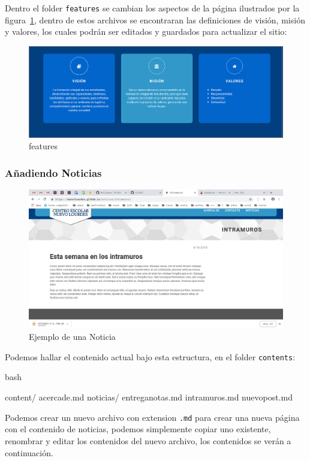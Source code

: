 Dentro el folder \texttt{features} se cambian los aspectos de la página ilustrados por la figura~\ref{fig:features}, dentro de estos archivos se encontraran las definiciones de visión, misión y valores, los cuales podrán ser editados y guardados para actualizar el sitio:

\begin{figure}[htbp]
\centering
\includegraphics[width=12cm]{../static/img/features.png}
\caption{features}
\label{fig:features}
\end{figure}

\subsubsection{Añadiendo Noticias}

\begin{figure}[htbp]
\centering
\includegraphics[width=12cm]{../static/img/noticia.png}
\caption{Ejemplo de una Noticia}
\label{fig:noticia}
\end{figure}

Podemos hallar el contenido actual bajo esta estructura, en el folder
\texttt{contents}:

\begin{codeblock}{bash}

content/
  acercade.md
  noticias/
    entreganotas.md
    intramuros.md
    nuevopost.md
\end{codeblock}

Podemos crear un nuevo archivo con extension \texttt{.md} para crear una
nueva página con el contenido de noticias, podemos simplemente copiar
uno existente, renombrar y editar los contenidos del nuevo archivo, los
contenidos se verán a continuación.


